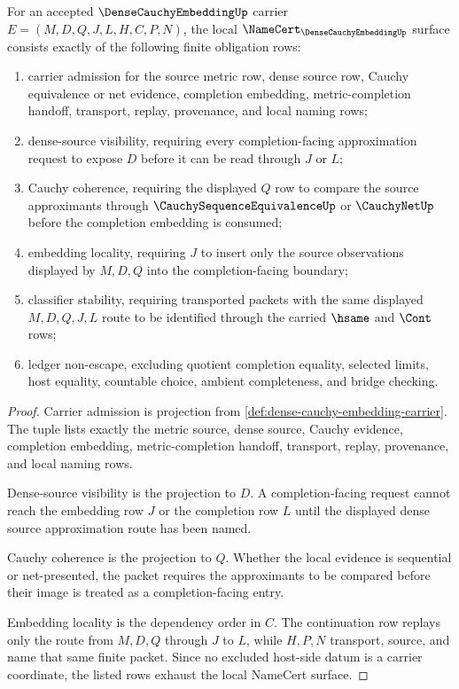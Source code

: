 \begin{theorem}
\label{thm:dense-cauchy-embedding-namecert-obligations}
For an accepted $\DenseCauchyEmbeddingUp$ carrier $E=(M,D,Q,J,L,H,C,P,N)$, the local $\NameCert_{\DenseCauchyEmbeddingUp}$ surface consists exactly of the following finite obligation rows:
\begin{enumerate}
\item carrier admission for the source metric row, dense source row, Cauchy equivalence or net evidence, completion embedding, metric-completion handoff, transport, replay, provenance, and local naming rows;
\item dense-source visibility, requiring every completion-facing approximation request to expose $D$ before it can be read through $J$ or $L$;
\item Cauchy coherence, requiring the displayed $Q$ row to compare the source approximants through $\CauchySequenceEquivalenceUp$ or $\CauchyNetUp$ before the completion embedding is consumed;
\item embedding locality, requiring $J$ to insert only the source observations displayed by $M,D,Q$ into the completion-facing boundary;
\item classifier stability, requiring transported packets with the same displayed $M,D,Q,J,L$ route to be identified through the carried $\hsame$ and $\Cont$ rows;
\item ledger non-escape, excluding quotient completion equality, selected limits, host equality, countable choice, ambient completeness, and bridge checking.
\end{enumerate}
\end{theorem}
\begin{proof}
Carrier admission is projection from \autoref{def:dense-cauchy-embedding-carrier}. The tuple lists exactly the metric source, dense source, Cauchy evidence, completion embedding, metric-completion handoff, transport, replay, provenance, and local naming rows.

Dense-source visibility is the projection to $D$. A completion-facing request cannot reach the embedding row $J$ or the completion row $L$ until the displayed dense source approximation route has been named.

Cauchy coherence is the projection to $Q$. Whether the local evidence is sequential or net-presented, the packet requires the approximants to be compared before their image is treated as a completion-facing entry.

Embedding locality is the dependency order in $C$. The continuation row replays only the route from $M,D,Q$ through $J$ to $L$, while $H,P,N$ transport, source, and name that same finite packet. Since no excluded host-side datum is a carrier coordinate, the listed rows exhaust the local NameCert surface.
\end{proof}

